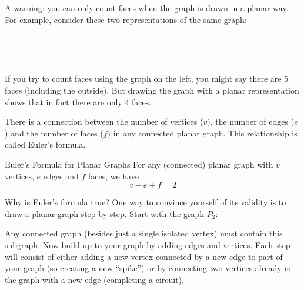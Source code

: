 \documentclass[12pt]{article}
\begin{document}
A warning: you can only count faces when the graph is drawn in a planar way.  For example, consider these two representations of the same graph:

\begin{center}
 ~ \hfill
  \hfill
  \hfill ~
\end{center}

If you try to count faces using the graph on the left, you might say there are 5 faces (including the outside).  But drawing the graph with a planar representation shows that in fact there are only 4 faces.



There is a connection between the number of vertices ($v$), the number of edges ($e$) and the number of faces ($f$) in any connected planar graph.  This relationship is called Euler's formula.

\begin{defbox}{Euler's Formula for Planar Graphs}
For any (connected) planar graph with $v$ vertices, $e$ edges and $f$ faces, we have
\[v-e + f = 2\]
\end{defbox}

Why is Euler's formula true?  One way to convince yourself of its validity is to draw a planar graph step by step.  Start with the graph $P_2$:

\begin{center}
\end{center}

Any connected graph (besides just a single isolated vertex) must contain this subgraph.  Now build up to your graph by adding edges and vertices.  Each step will consist of either adding a new vertex connected by a new edge to part of your graph (so creating a new ``spike'') or by connecting two vertices already in the graph with a new edge (completing a circuit).

\begin{center}
  ~ \hfill
  \hfill
  \hfill ~
\end{center}
\end{document}
